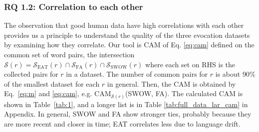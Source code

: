 \documentclass[letterpaper]{article} %
\begin{document}
\subsubsection{RQ 1.2: Correlation to each other}
\label{sec:correlation}
The observation that good human data have high correlations with each other \cite{miller1991contextual, Resnik:1995:UIC:1625855.1625914} provides us a principle to understand the quality of the three evocation datasets by examining how they correlate. Our tool is CAM of Eq. \ref{eq:cam} defined on the common set of word pairs, the intersection $\mathcal{S}(r)=\mathcal{S}_{\text{EAT}}(r) \cap \mathcal{S}_{\text{FA}}(r) \cap \mathcal{S}_{\text{SWOW}}(r)$ where each set on RHS is the collected pairs for $r$ in a dataset. The number of common pairs for $r$ is about 90\% of the smallest dataset for each $r$ in general. Then, the CAM is obtained by Eq.~\ref{eq:m} and \ref{eq:cam}, e.g. CAM$_{\mathcal{S}(r)}$(SWOW, FA). The calculated CAM is shown in Table~\ref{tab:1}, and a longer list is in Table \ref{tab:full_data_lar_cam} in Appendix. In general, SWOW and FA show stronger ties, probably because they are more recent and closer in time; EAT correlates less due to language drift. 
\end{document}
